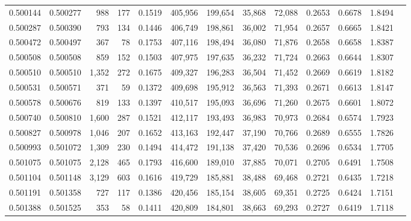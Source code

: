 \begin{tabular}{rrrrrrrrrrrrr}
0.500144 & 0.500277 &   988 &   177 &                                     0.1519 & 405,956 & 199,654 &  35,868 &  72,088 & 0.2653 & 0.6678 & 1.8494 \\
0.500287 & 0.500390 &   793 &   134 &                                     0.1446 & 406,749 & 198,861 &  36,002 &  71,954 & 0.2657 & 0.6665 & 1.8421 \\
0.500472 & 0.500497 &   367 &    78 &                                     0.1753 & 407,116 & 198,494 &  36,080 &  71,876 & 0.2658 & 0.6658 & 1.8387 \\
0.500508 & 0.500508 &   859 &   152 &                                     0.1503 & 407,975 & 197,635 &  36,232 &  71,724 & 0.2663 & 0.6644 & 1.8307 \\
0.500510 & 0.500510 & 1,352 &   272 &                                     0.1675 & 409,327 & 196,283 &  36,504 &  71,452 & 0.2669 & 0.6619 & 1.8182 \\
0.500531 & 0.500571 &   371 &    59 &                                     0.1372 & 409,698 & 195,912 &  36,563 &  71,393 & 0.2671 & 0.6613 & 1.8147 \\
0.500578 & 0.500676 &   819 &   133 &                                     0.1397 & 410,517 & 195,093 &  36,696 &  71,260 & 0.2675 & 0.6601 & 1.8072 \\
0.500740 & 0.500810 & 1,600 &   287 &                                     0.1521 & 412,117 & 193,493 &  36,983 &  70,973 & 0.2684 & 0.6574 & 1.7923 \\
0.500827 & 0.500978 & 1,046 &   207 &                                     0.1652 & 413,163 & 192,447 &  37,190 &  70,766 & 0.2689 & 0.6555 & 1.7826 \\
0.500993 & 0.501072 & 1,309 &   230 &                                     0.1494 & 414,472 & 191,138 &  37,420 &  70,536 & 0.2696 & 0.6534 & 1.7705 \\
0.501075 & 0.501075 & 2,128 &   465 &                                     0.1793 & 416,600 & 189,010 &  37,885 &  70,071 & 0.2705 & 0.6491 & 1.7508 \\
0.501104 & 0.501148 & 3,129 &   603 &                                     0.1616 & 419,729 & 185,881 &  38,488 &  69,468 & 0.2721 & 0.6435 & 1.7218 \\
0.501191 & 0.501358 &   727 &   117 &                                     0.1386 & 420,456 & 185,154 &  38,605 &  69,351 & 0.2725 & 0.6424 & 1.7151 \\
0.501388 & 0.501525 &   353 &    58 &                                     0.1411 & 420,809 & 184,801 &  38,663 &  69,293 & 0.2727 & 0.6419 & 1.7118 \\

\end{tabular}
